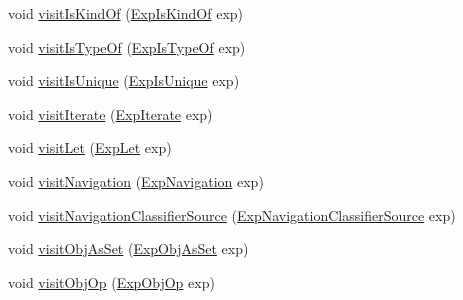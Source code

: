 \begin{DoxyCompactItemize}
\item 
void \hyperlink{classorg_1_1tzi_1_1use_1_1analysis_1_1coverage_1_1_abstract_coverage_visitor_a1f3b26ae050401af3bb23190b68ac371}{visit\-Is\-Kind\-Of} (\hyperlink{classorg_1_1tzi_1_1use_1_1uml_1_1ocl_1_1expr_1_1_exp_is_kind_of}{Exp\-Is\-Kind\-Of} exp)
\item 
void \hyperlink{classorg_1_1tzi_1_1use_1_1analysis_1_1coverage_1_1_abstract_coverage_visitor_aee231c2fa428dc545b87ae9675b9d5e2}{visit\-Is\-Type\-Of} (\hyperlink{classorg_1_1tzi_1_1use_1_1uml_1_1ocl_1_1expr_1_1_exp_is_type_of}{Exp\-Is\-Type\-Of} exp)
\item 
void \hyperlink{classorg_1_1tzi_1_1use_1_1analysis_1_1coverage_1_1_abstract_coverage_visitor_af6acd0b1123174d3a87e7e978c18463c}{visit\-Is\-Unique} (\hyperlink{classorg_1_1tzi_1_1use_1_1uml_1_1ocl_1_1expr_1_1_exp_is_unique}{Exp\-Is\-Unique} exp)
\item 
void \hyperlink{classorg_1_1tzi_1_1use_1_1analysis_1_1coverage_1_1_abstract_coverage_visitor_aed14ff99b7f8775c74d4825cead7dc4d}{visit\-Iterate} (\hyperlink{classorg_1_1tzi_1_1use_1_1uml_1_1ocl_1_1expr_1_1_exp_iterate}{Exp\-Iterate} exp)
\item 
void \hyperlink{classorg_1_1tzi_1_1use_1_1analysis_1_1coverage_1_1_abstract_coverage_visitor_abfc9e5d9692adecfd5a0a644c8bfbbff}{visit\-Let} (\hyperlink{classorg_1_1tzi_1_1use_1_1uml_1_1ocl_1_1expr_1_1_exp_let}{Exp\-Let} exp)
\item 
void \hyperlink{classorg_1_1tzi_1_1use_1_1analysis_1_1coverage_1_1_abstract_coverage_visitor_af85ab2ed37340b3fcc1bb97b3f0121e4}{visit\-Navigation} (\hyperlink{classorg_1_1tzi_1_1use_1_1uml_1_1ocl_1_1expr_1_1_exp_navigation}{Exp\-Navigation} exp)
\item 
void \hyperlink{classorg_1_1tzi_1_1use_1_1analysis_1_1coverage_1_1_abstract_coverage_visitor_a40554703701b8b97026537be876fd1c9}{visit\-Navigation\-Classifier\-Source} (\hyperlink{classorg_1_1tzi_1_1use_1_1uml_1_1ocl_1_1expr_1_1_exp_navigation_classifier_source}{Exp\-Navigation\-Classifier\-Source} exp)
\item 
void \hyperlink{classorg_1_1tzi_1_1use_1_1analysis_1_1coverage_1_1_abstract_coverage_visitor_aca6f1832548af6de0ebee9e033c7b825}{visit\-Obj\-As\-Set} (\hyperlink{classorg_1_1tzi_1_1use_1_1uml_1_1ocl_1_1expr_1_1_exp_obj_as_set}{Exp\-Obj\-As\-Set} exp)
\item 
void \hyperlink{classorg_1_1tzi_1_1use_1_1analysis_1_1coverage_1_1_abstract_coverage_visitor_ac8b657a4dc9d9f6f3e20930bb3b71158}{visit\-Obj\-Op} (\hyperlink{classorg_1_1tzi_1_1use_1_1uml_1_1ocl_1_1expr_1_1_exp_obj_op}{Exp\-Obj\-Op} exp)

\end{DoxyCompactItemize}
